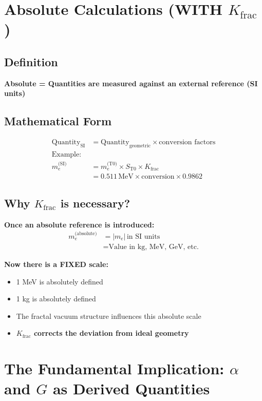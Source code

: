 	\section{Absolute Calculations (WITH $K_{\text{frac}}$)}
	
	\subsection{Definition}
	
	\textbf{Absolute = Quantities are measured against an external reference (SI units)}
	
	\subsection{Mathematical Form}
	\begin{align*}
		\text{Quantity}_{\text{SI}} &= \text{Quantity}_{\text{geometric}} \times \text{conversion factors} \\
		\text{Example:} & \\
		m_e^{\text{(SI)}} &= m_e^{\text{(T0)}} \times S_{\text{T0}} \times K_{\text{frac}} \\
		&= 0.511\,\text{MeV} \times \text{conversion} \times 0.9862
	\end{align*}
	
	\subsection{Why $K_{\text{frac}}$ is necessary?}
	
	\textbf{Once an absolute reference is introduced:}
	\begin{align*}
		m_e^{\text{(absolute)}} &= |m_e|\,\text{in SI units} \\
		&= \text{Value in kg, MeV, GeV, etc.}
	\end{align*}
	
	\textbf{Now there is a FIXED scale:}
	\begin{itemize}
		\item 1 MeV is absolutely defined
		\item 1 kg is absolutely defined  
		\item The fractal vacuum structure influences this absolute scale
		\item \textbf{$K_{\text{frac}}$ corrects the deviation from ideal geometry}
	\end{itemize}
	
	\section{The Fundamental Implication: $\alpha$ and $G$ as Derived Quantities}
	
